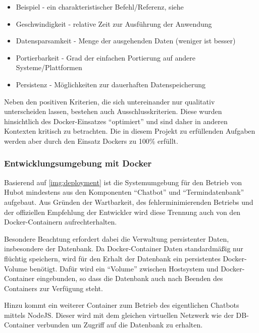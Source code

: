 \begin{itemize}
    \item Beispiel - ein charakteristischer Befehl/Referenz, siehe \cite{HubotDeploying2018}
    \item Geschwindigkeit - relative Zeit zur Ausführung der Anwendung
    \item Datensparsamkeit - Menge der ausgehenden Daten (weniger ist besser)
    \item Portierbarkeit - Grad der einfachen Portierung auf andere Systeme/Plattformen
    \item Persistenz - Möglichkeiten zur dauerhaften Datenspeicherung
\end{itemize}

Neben den positiven Kriterien, die sich untereinander nur qualitativ unterscheiden lassen, bestehen auch Ausschlusskriterien. Diese wurden hinsichtlich des Docker-Einsatzes \enquote{optimiert} und sind daher in anderen Kontexten kritisch zu betrachten. Die in diesem Projekt zu erfüllenden Aufgaben werden aber durch den Einsatz Dockers zu 100\% erfüllt.

\subsubsection{Entwicklungsumgebung mit Docker}

Basierend auf \autoref{img:deployment} ist die Systemumgebung für den Betrieb von Hubot mindestens aus den Komponenten \enquote{Chatbot} und \enquote{Termindatenbank} aufgebaut. Aus Gründen der Wartbarkeit, des fehlerminimierenden Betriebs und der offiziellen Empfehlung der Entwickler wird diese Trennung auch von den Docker-Containern aufrechterhalten.

Besondere Beachtung erfordert dabei die Verwaltung persistenter Daten, insbesondere der Datenbank. Da Docker-Container Daten standardmäßig nur flüchtig speichern, %
wird für den Erhalt der Datenbank ein persistentes Docker-Volume benötigt. Dafür wird ein \enquote{Volume} zwischen Hostsystem und Docker-Container eingebunden, so dass die Datenbank auch nach Beenden des Containers zur Verfügung steht.

Hinzu kommt ein weiterer Container zum Betrieb des eigentlichen Chatbots mittels NodeJS. Dieser wird mit dem gleichen virtuellen Netzwerk wie der DB-Container verbunden um Zugriff auf die Datenbank zu erhalten.

